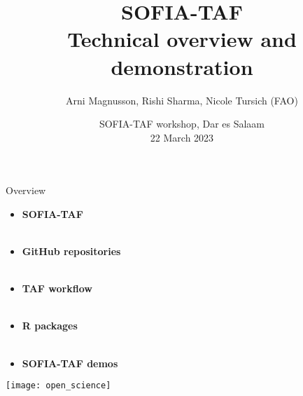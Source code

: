 \documentclass[aspectratio=169]{beamer}
\begin{document}
\begin{frame}
  \title{SOFIA-TAF\\[1ex]
    {\large\darkgreen Technical overview and demonstration}}
  \author{\vspace{-4ex}
    Arni Magnusson, Rishi Sharma, Nicole Tursich (FAO)}
  \date{SOFIA-TAF workshop, Dar es Salaam\\[0.2ex]
    22 March 2023}
  \titlepage
\end{frame}


\begin{frame}{Overview}
  \begin{itemize}
    \item[] {\bf\darkblue SOFIA-TAF}\\[0.1ex]
    \\[2.5ex]
    \item[] {\bf\darkblue GitHub repositories}\\[0.1ex]
    \\[2.5ex]
    \item[] {\bf\darkblue TAF workflow}\\[0.1ex]
    \\[2.5ex]
    \item[] {\bf\darkblue R packages}\\[0.1ex]
    \\[2.5ex]
    \item[] {\bf\darkblue SOFIA-TAF demos}\\[0.1ex]
  \end{itemize}
\end{frame}


\begin{frame}
  \centering
  \vspace{1.5ex}
  \texttt{[image: open\_science]}
\end{frame}

\end{document}
